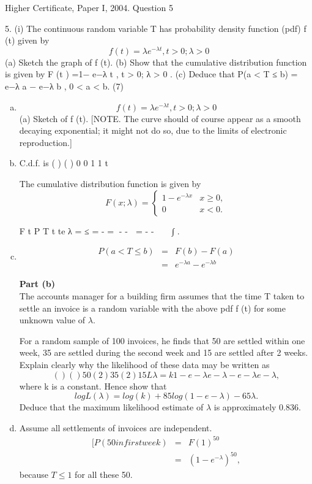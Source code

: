 \documentclass[a4paper,12pt]{article}
\begin{document}
Higher Certificate, Paper I, 2004. Question 5
\begin{framed}
5. (i) The continuous random variable T has probability density function (pdf) f (t)
given by
\[f (t ) =\lambda e^{-\lambda t}  , t > 0; \lambda > 0\]
(a) Sketch the graph of f (t).
(b) Show that the cumulative distribution function is given by
F (t ) =1− e−λ t , t > 0; λ > 0 .
(c) Deduce that
P(a < T ≤ b) = e−λ a − e−λ b , 0 < a < b.
(7)

\end{framed}



\begin{enumerate}[(a)]
\item  \[f (t ) =\lambda e^{-\lambda t}  , t > 0; \lambda > 0\]
(a) Sketch of f (t).
[NOTE. The curve should of course appear as a smooth decaying exponential;
it might not do so, due to the limits of electronic reproduction.]
\item C.d.f. is ( ) ( ) 0
0
1 1
t

The cumulative distribution function is given by 
\[ {\displaystyle F(x;\lambda )={\begin{cases}1-e^{-\lambda x}&x\geq 0,\\0&x<0.\end{cases}}} \]


F t P T t t\lambdae \lambdavdv \lambdae \lambdav e \lambdat
λ
= ≤ = - = - -  = - -   ∫ .

\item 
\begin{eqnarray*}
P(a < T \leq b) &=& F (b) - F (a) \\ 
&=& e^{-\lambda a}  - e^{-\lambda b} 
\end{eqnarray*}
\newpage
\begin{framed}
\noindent \textbf{Part (b)}\\ 
The accounts manager for a building firm assumes that the time T taken to
settle an invoice is a random variable with the above pdf f (t) for some
unknown value of $\lambda$. 

For a random sample of 100 invoices, he finds that 50 are
settled within one week, 35 are settled during the second week and 15 are
settled after 2 weeks. Explain clearly why the likelihood of these data may be
written as
\[( ) ( )50 ( 2 )35 ( 2 )15 L λ = k 1− e−λ e−λ − e− λ e− λ ,\]
where k is a constant.
Hence show that
\[log L(\lambda ) = log(k ) + 85log (1− e−\lambda )− 65\lambda .\]
Deduce that the maximum likelihood estimate of $\lambda$ is approximately 0.836.
\end{framed}
\item Assume all settlements of invoices are independent.
\begin{eqnarray*}
[P(50 in first week) &=& F{ (1)}^{50}  \\
&=& \left(1- e^{-\lambda}\right)^{50}  ,
\end{eqnarray*} 
because $T \leq 1$ for all these 50.


\end{enumerate}
\end{document}
